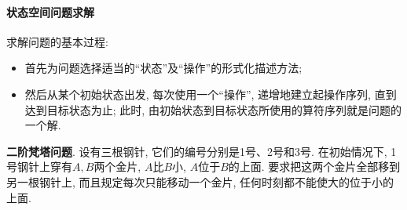 \paragraph{状态空间问题求解}
求解问题的基本过程:
\begin{itemize}
\item 首先为问题选择适当的“状态”及“操作”的形式化描述方法;
\item 然后从某个初始状态出发, 每次使用一个“操作”, 递增地建立起操作序列, 直到达到目标状态为止; 此时, 由初始状态到目标状态所使用的算符序列就是问题的一个解.
\end{itemize}
\begin{example}
    \textbf{二阶梵塔问题}. 设有三根钢针, 它们的编号分别是1号、2号和3号. 在初始情况下, 1号钢针上穿有$A,B$两个金片, $A$比$B$小, $A$位于$B$的上面. 要求把这两个金片全部移到另一根钢针上, 而且规定每次只能移动一个金片, 任何时刻都不能使大的位于小的上面.
\end{example}
